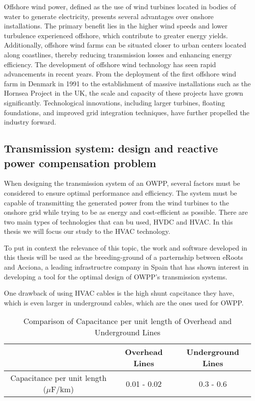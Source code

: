 \documentclass[a4paper,11pt, titlepage, twoside]{article}
\begin{document}
Offshore wind power, defined as the use of wind turbines located in bodies of water to generate electricity, presents several advantages over onshore installations. The primary benefit lies in the higher wind speeds
and lower turbulence experienced offshore, which contribute to greater energy yields. Additionally, offshore wind farms can be situated closer to urban centers located along coastlines, thereby reducing transmission
losses and enhancing energy efficiency. The development of offshore wind technology has seen rapid advancements in recent years. From the deployment of the first offshore wind farm in Denmark in 1991 to the establishment
of massive installations such as the Hornsea Project in the UK, the scale and capacity of these projects have grown significantly. Technological innovations, including larger turbines, floating foundations, and improved
grid integration techniques, have further propelled the industry forward.

\subsection{Transmission system: design and reactive power compensation problem}\label{reactpowpresetation}

When designing the transmission system of an OWPP, several factors must be considered to ensure optimal performance and efficiency. The system must be capable of transmitting the generated power from the wind turbines to the onshore grid
while trying to be as energy and cost-efficient as possible. There are two main types of technologies that can bu used, HVDC and HVAC. In this thesis we will focus our study to the HVAC technology.\par

To put in context the relevance of this topic, the work and software developed in this thesis will be used
as the breeding-ground of a parternship between eRoots and Acciona, a leading infrastructre company in Spain that has shown interest in developing a tool for the optimal design
of OWPP's transmission systems.

One drawback of using HVAC cables is the high shunt capcitance they have, which is even larger in underground cables,
which are the ones used for OWPP.

\begin{table}[h]
    \centering
    \begin{tabular}{|c|c|c|}
    \hline
     & Overhead Lines & Underground Lines \\
     \hline
    Capacitance per unit length ($\mu$F/km) & 0.01 - 0.02  & 0.3 - 0.6 \\
    \hline
    \end{tabular}
    \caption{Comparison of Capacitance per unit length of Overhead and Underground Lines}
    \label{tab:capacitance_comparison}
    \end{table}
\end{document}
